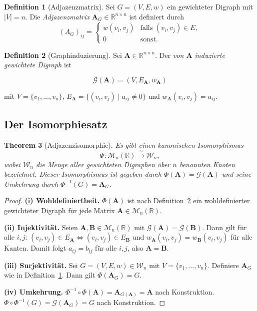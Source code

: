 ﻿\documentclass[12pt, a4paper]{article}
\newtheorem{theorem}{Theorem}[section]
\theoremstyle{definition}
\newtheorem{definition}[theorem]{Definition}
\theoremstyle{remark}
\newcommand{\R}{\mathbb{R}}
\newcommand{\vA}{\bm{A}}
\newcommand{\vB}{\bm{B}}
\begin{document}
\begin{definition}[Adjazenzmatrix]
\label{def:adj}
Sei $G = (V, E, w)$ ein gewichteter Digraph mit $|V| = n$. Die
\emph{Adjazenzmatrix} $\vA_G \in \R^{n \times n}$ ist definiert durch
\[
  (A_G)_{ij} =
  \begin{cases}
    w(v_i, v_j) & \text{falls } (v_i, v_j) \in E, \\
    0 & \text{sonst.}
  \end{cases}
\]
\end{definition}

\begin{definition}[Graphinduzierung]
\label{def:graph_induktion}
Sei $\vA \in \R^{n \times n}$. Der \emph{von $\vA$ induzierte gewichtete
Digraph} ist

\begin{equation}
  \mathcal{G}(\vA) = (V, E_{\vA}, w_{\vA})
\end{equation}

mit $V = \{v_1,\ldots,v_n\}$, $E_{\vA} = \{(v_i, v_j) \mid a_{ij} \neq 0\}$ und $w_{\vA}(v_i, v_j) = a_{ij}$.
\end{definition}

\subsection{Der Isomorphiesatz}
\label{subsec:iso}

\begin{theorem}[Adjazenzisomorphie]
\label{thm:iso}
Es gibt einen kanonischen Isomorphismus
\[
  \Phi: \mathcal{M}_n(\R) \xrightarrow{\;\sim\;} \mathcal{W}_n,
\]
wobei $\mathcal{W}_n$ die Menge aller gewichteten Digraphen über $n$
benannten Knoten bezeichnet. Dieser Isomorphismus ist gegeben durch
$\Phi(\vA) = \mathcal{G}(\vA)$ und seine Umkehrung durch
$\Phi^{-1}(G) = \vA_G$.
\end{theorem}

\begin{proof}
\textbf{(i) Wohldefiniertheit.} $\Phi(\vA)$ ist nach
Definition~\ref{def:graph_induktion} ein wohldefinierter gewichteter
Digraph für jede Matrix $\vA \in \mathcal{M}_n(\R)$.

\textbf{(ii) Injektivität.} Seien $\vA, \vB \in \mathcal{M}_n(\R)$ mit
$\mathcal{G}(\vA) = \mathcal{G}(\vB)$. Dann gilt für alle $i,j$:
$(v_i,v_j) \in E_{\vA} \Leftrightarrow (v_i,v_j) \in E_{\vB}$ und
$w_{\vA}(v_i,v_j) = w_{\vB}(v_i,v_j)$ für alle Kanten. Damit folgt
$a_{ij} = b_{ij}$ für alle $i,j$, also $\vA = \vB$.

\textbf{(iii) Surjektivität.} Sei $G = (V,E,w) \in \mathcal{W}_n$
mit $V = \{v_1,\ldots,v_n\}$. Definiere $\vA_G$ wie in
Definition~\ref{def:adj}. Dann gilt $\Phi(\vA_G) = G$.

\textbf{(iv) Umkehrung.} $\Phi^{-1} \circ \Phi(\vA) = \vA_{G(\vA)} = \vA$
nach Konstruktion. $\Phi \circ \Phi^{-1}(G) = \mathcal{G}(\vA_G) = G$
nach Konstruktion.
\end{proof}
\end{document}
